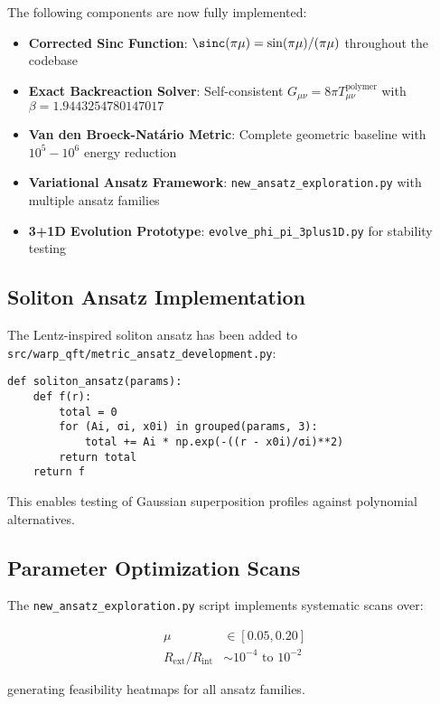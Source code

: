 \documentclass[12pt,a4paper]{article}
\begin{document}
The following components are now fully implemented:

\begin{itemize}
\item \textbf{Corrected Sinc Function}: $\sinc(\pi\mu) = \sin(\pi\mu)/(\pi\mu)$ throughout the codebase
\item \textbf{Exact Backreaction Solver}: Self-consistent $G_{\mu\nu} = 8\pi T_{\mu\nu}^{\text{polymer}}$ with $\beta = 1.9443254780147017$
\item \textbf{Van den Broeck-Natário Metric}: Complete geometric baseline with $10^5-10^6$ energy reduction
\item \textbf{Variational Ansatz Framework}: \texttt{new\_ansatz\_exploration.py} with multiple ansatz families
\item \textbf{3+1D Evolution Prototype}: \texttt{evolve\_phi\_pi\_3plus1D.py} for stability testing
\end{itemize}

\subsection{Soliton Ansatz Implementation}

The Lentz-inspired soliton ansatz has been added to \texttt{src/warp\_qft/metric\_ansatz\_development.py}:

\begin{verbatim}
def soliton_ansatz(params):
    def f(r):
        total = 0
        for (Ai, σi, x0i) in grouped(params, 3):
            total += Ai * np.exp(-((r - x0i)/σi)**2)
        return total
    return f
\end{verbatim}

This enables testing of Gaussian superposition profiles against polynomial alternatives.

\subsection{Parameter Optimization Scans}

The \texttt{new\_ansatz\_exploration.py} script implements systematic scans over:

\begin{align}
\mu &\in [0.05, 0.20] \\
R_{\text{ext}}/R_{\text{int}} &\sim 10^{-4} \text{ to } 10^{-2}
\end{align}

generating feasibility heatmaps for all ansatz families.
\end{document}
